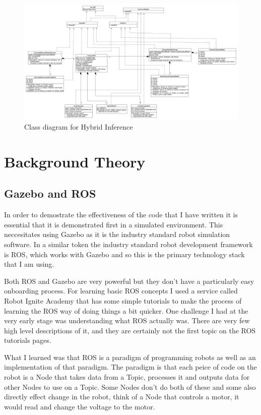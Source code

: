 \documentclass[]{../resources/final_report}
\begin{document}
\begin{figure}[h]
  \centering
  \includegraphics[height=0.36\textheight]{hybrid-inference-uml.png}
  \caption{Class diagram for Hybrid Inference}
  \label{}
\end{figure}


\chapter{Background Theory}

\section{Gazebo and ROS}

In order to demostrate the effectiveness of the code that I have written it is essential that it is 
demonstrated first in a simulated environment. This neccesitates using Gazebo as it is the industry 
standard robot simulation software. In a similar token the industry standard robot development 
framework is ROS, which works with Gazebo and so this is the primary technology stack that I am 
using.

Both ROS and Gazebo are very powerful but they don't have a particularly easy onboarding process. 
For learning basic ROS concepts I used a service called Robot Ignite Academy that has some simple 
tutorials to make the process of learning the ROS way of doing things a bit quicker. One challenge I 
had at the very early stage was understanding what ROS actually was. There are very few high level 
descriptions of it, and they are certainly not the first topic on the ROS tutorials pages.

What I learned was that ROS is a paradigm of programming robots as well as an 
implementation of that paradigm. The paradigm is that each peice of code on the robot is a Node 
that takes data from a Topic, processes it and outputs data for other Nodes to use on a Topic. 
Some Nodes don't do both of these and some also directly effect change in the robot, think of a 
Node that controls a motor, it would read and change the voltage to the motor.
\end{document}
